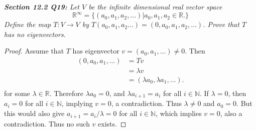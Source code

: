 \documentclass{article}
\begin{document}
\it \textbf{Section 12.2 Q19:} Let $V$ be the infinite dimensional real
  vector space
  \[\mathbb{R}^\infty =\{(a_0,a_1,a_2,\ldots)|a_0,a_1,a_2\in\mathbb{R}.\}\]
  Define the map $T:V\rightarrow V$ by
  $T(a_0,a_1,a_2\ldots)=(0,a_0,a_1,a_2,\ldots)$. Prove that $T$ has no
  eigenvectors.

  \begin{proof}
    Assume that $T$ has eigenvector $v=(a_0,a_1,\ldots)\neq0$. Then
    \begin{align*}
      (0,a_0,a_1,\ldots) &=Tv\\
      &=\lambda v\\
      &=(\lambda a_0,\lambda a_1,\ldots).\\
    \end{align*}
    for some $\lambda\in\mathbb{R}$. Therefore $\lambda a_0=0$, and
    $\lambda a_{i+1}=a_i$ for all $i\in\mathbb{N}$. If $\lambda=0$, then
    $a_i=0$ for all $i\in\mathbb{N}$, implying $v=0$, a contradiction. Thus
    $\lambda\neq0$ and $a_0=0$. But this would also give
    $a_{i+1}=a_i/\lambda=0$ for all $i\in\mathbb{N}$, which implies $v=0$,
    also a contradiction. Thus no such $v$ exists.
  \end{proof}
\end{document}
